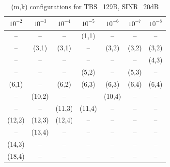 \begin{table}[ht]
\centering
\caption{(m,k) configurations for TBS=129B, SINR=20dB}
\label{tab:conf_{129B_20dB}}
\begin{tabular}{ccccccc}
\hline
$10^{-2}$ & $10^{-3}$ & $10^{-4}$ & $10^{-5}$ & $10^{-6}$ & $10^{-7}$ & $10^{-8}$ \\ \hline
-- & -- & -- & (1,1) & -- & -- & -- \\
-- & (3,1) & (3,1) & -- & (3,2) & (3,2) & (3,2) \\
-- & -- & -- & -- & -- & -- & (4,3) \\
-- & -- & -- & (5,2) & -- & (5,3) & -- \\
(6,1) & -- & (6,2) & (6,3) & (6,3) & (6,4) & (6,4) \\
-- & (10,2) & -- & -- & (10,4) & -- & -- \\
-- & -- & (11,3) & (11,4) & -- & -- & -- \\
(12,2) & (12,3) & (12,4) & -- & -- & -- & -- \\
-- & (13,4) & -- & -- & -- & -- & -- \\
(14,3) & -- & -- & -- & -- & -- & -- \\
(18,4) & -- & -- & -- & -- & -- & -- \\
\hline
\end{tabular}
\end{table}